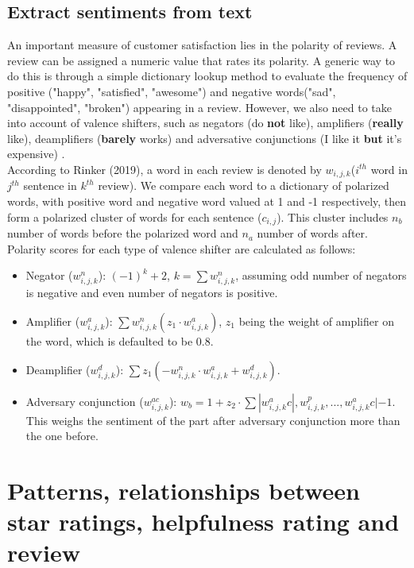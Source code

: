 \documentclass[reqno]{article}
\theoremstyle{definition}
\theoremstyle{definition}
\theoremstyle{remark}
\begin{document}
\subsection{Extract sentiments from text}
An important measure of customer satisfaction lies in the polarity of reviews. A review can be assigned a numeric value that rates its polarity. A generic way to do this is through a simple dictionary lookup method to evaluate the frequency of positive ("happy", "satisfied", "awesome") and negative words("sad", "disappointed", "broken") appearing in a review. However, we also need to take into account of valence shifters, such as negators (do \textbf{not} like), amplifiers (\textbf{really} like), deamplifiers (\textbf{barely} works) and adversative conjunctions (I like it \textbf{but} it's expensive) \cite{sentimentr}. \\
According to Rinker (2019), a word in each review is denoted by $w_{i,j,k}$($i^{th}$ word in $j^{th}$ sentence in $k^{th}$ review). We compare each word to a dictionary of polarized  words, with positive word and negative word valued at 1 and -1 respectively, then form a polarized cluster of words for each sentence ($c_{i,j}$). This cluster includes $n_b$ number of words before the polarized word and $n_a$ number of words after. Polarity scores for each type of valence shifter are calculated as follows: 
\begin{itemize}
    \item Negator ($w_{i,j,k}^n$): $(-1)^k + 2$, $k = \sum{{w_{i,j,k}^n}}$, assuming odd number of negators is negative and even number of negators is positive.
    \item Amplifier ($w_{i,j,k}^a$): $\sum {w_{i,j,k}^n(z_1 \cdot w_{i,j,k}^a)}$, $z_1$ being the weight of amplifier on the word, which is defaulted to be $0.8$.
    \item Deamplifier ($w_{i,j,k}^d$): $\sum {z_1( -w_{i,j,k}^n \cdot w_{i,j,k}^a + w_{i,j,k}^d)}$. 
    \item Adversary conjunction ($w_{i,j,k}^{ac}$): $w_b = 1+z_2 \cdot \sum {|w_{i,j,k}^ac|, w_{i,j,k}^p,...,w_{i,j,k}^ac| - 1}$. This weighs the sentiment of the part after adversary conjunction more than the one before.
\end{itemize}
\section{Patterns, relationships between star ratings, helpfulness rating and review}
\end{document}
